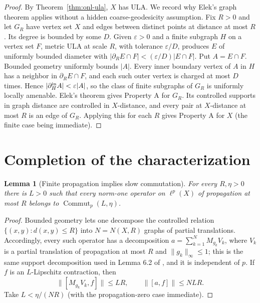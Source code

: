 \documentclass[11pt]{article}
\newtheorem{lemma}[theorem]{Lemma}
\newcommand{\Commut}{\operatorname{Commut}}
\begin{document}
\begin{proof}
By Theorem~\ref{thm:onl-ula}, $X$ has ULA. We record why Elek's graph theorem
\cite{Elek} applies without a hidden coarse-geodesicity assumption. Fix $R>0$
and let $G_R$ have vertex set $X$ and edges between distinct points at distance
at most $R$. Its degree is bounded by some $D$. Given $\varepsilon>0$ and a
finite subgraph $H$ on a vertex set $F$, metric ULA at scale $R$, with tolerance
$\varepsilon/D$, produces $E$ of uniformly bounded diameter with
$|\partial_RE\cap F|<(\varepsilon/D)|E\cap F|$. Put $A=E\cap F$. Bounded
geometry uniformly bounds $|A|$. Every inner boundary vertex of $A$ in $H$
has a neighbor in $\partial_RE\cap F$, and each such outer vertex is charged
at most $D$ times. Hence $|\partial_H^{\rm in}A|<\varepsilon|A|$, so the class
of finite subgraphs of $G_R$ is uniformly locally amenable. Elek's theorem
gives Property A for $G_R$. Its controlled supports in graph distance are
controlled in $X$-distance, and every pair at $X$-distance at most $R$ is an
edge of $G_R$. Applying this for each $R$ gives Property A for $X$ (the finite
case being immediate).
\end{proof}

\section{Completion of the characterization}

\begin{lemma}[Finite propagation implies slow commutation]\label{lem:comm}
For every $R,\eta>0$ there is $L>0$ such that every norm-one operator on
$\ell^p(X)$ of propagation at most $R$ belongs to $\Commut_p(L,\eta)$.
\end{lemma}

\begin{proof}
Bounded geometry lets one decompose the controlled relation
$\{(x,y):d(x,y)\le R\}$ into $N=N(X,R)$ graphs of partial translations.
Accordingly, every such operator has a decomposition
$a=\sum_{k=1}^N M_{g_k}V_k$, where $V_k$ is a partial translation of
propagation at most $R$ and $\|g_k\|_\infty\le1$; this is the same support
decomposition used in Lemma 6.2 of \cite{SZ}, and it is independent of $p$.
If $f$ is an $L$-Lipschitz contraction, then
\[
 \|[M_{g_k}V_k,f]\|\le LR,
 \qquad
 \|[a,f]\|\le NLR.
\]
Take $L<\eta/(NR)$ (with the propagation-zero case immediate).
\end{proof}
\end{document}
